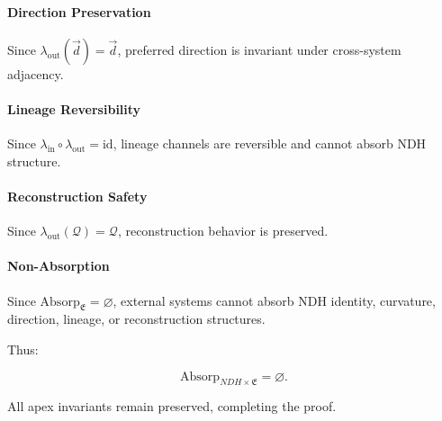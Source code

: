 \paragraph{Direction Preservation}
Since $\lambda_{\mathrm{out}}(\vec{d}) = \vec{d}$, preferred direction is
invariant under cross-system adjacency.

\paragraph{Lineage Reversibility}
Since $\lambda_{\mathrm{in}} \circ \lambda_{\mathrm{out}} = \mathrm{id}$,
lineage channels are reversible and cannot absorb NDH structure.

\paragraph{Reconstruction Safety}
Since $\lambda_{\mathrm{out}}(\mathcal{Q}) = \mathcal{Q}$, reconstruction
behavior is preserved.

\paragraph{Non-Absorption}
Since $\mathrm{Absorp}_{\mathfrak{E}} = \varnothing$, external systems cannot
absorb NDH identity, curvature, direction, lineage, or reconstruction
structures.

Thus:

\[
\mathrm{Absorp}_{NDH \times \mathfrak{E}} = \varnothing.
\]

All apex invariants remain preserved, completing the proof.

